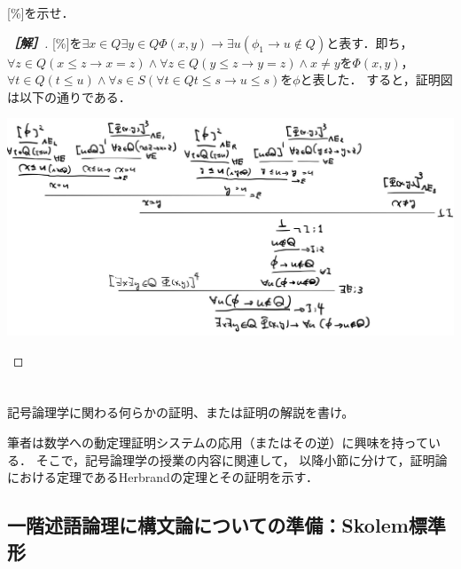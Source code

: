 \documentclass[uplatex,dvipdfmx]{jsarticle}
\begin{document}
\begin{problem}\mbox{}
    [\%]を示せ．
\end{problem}
\begin{proof}[\bf{［解］}]\mbox{}
    [\%]を$\exists x\in Q\exists y\in Q\Phi(x,y)\to\exists u(\phi_1\to u\notin Q)$と表す．即ち，$\forall z\in Q(x\le z\to x=z)\land \forall z\in Q(y\le z\to y=z)\land x\ne y$を$\Phi(x,y)$，$\forall t\in Q(t\le u)\land \forall s\in S(\forall t\in Q t\le s \to u\le s)$を$\phi$と表した．
    すると，証明図は以下の通りである．
    \begin{center}
        \includegraphics[width=15cm]{figure4-1.jpg}
    \end{center}
\end{proof}

\section{}

\begin{problem}
    記号論理学に関わる何らかの証明、または証明の解説を書け。
\end{problem}
筆者は数学への動定理証明システムの応用（またはその逆）に興味を持っている．
そこで，記号論理学の授業の内容に関連して，
以降小節に分けて，証明論における定理であるHerbrandの定理とその証明を示す．

\subsection{一階述語論理に構文論についての準備：Skolem標準形}
\end{document}
